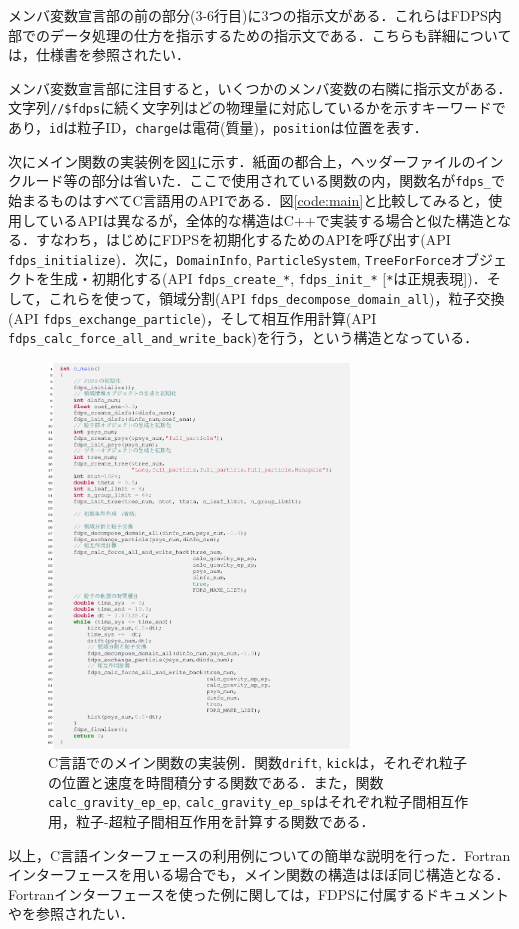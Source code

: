 メンバ変数宣言部の前の部分(3-6行目)に3つの指示文がある．これらはFDPS内部でのデータ処理の仕方を指示するための指示文である．こちらも詳細については，仕様書を参照されたい．

メンバ変数宣言部に注目すると，いくつかのメンバ変数の右隣に指示文がある．文字列\texttt{//\$fdps}に続く文字列はどの物理量に対応しているかを示すキーワードであり，\texttt{id}は粒子ID，\texttt{charge}は電荷(質量)，\texttt{position}は位置を表す．

次にメイン関数の実装例を図\ref{fig:src_main_in_c}に示す．紙面の都合上，ヘッダーファイルのインクルード等の部分は省いた．ここで使用されている関数の内，関数名が\texttt{fdps\_}で始まるものはすべてC言語用のAPIである．図\ref{code:main}と比較してみると，使用しているAPIは異なるが，全体的な構造はC++で実装する場合と似た構造となる．すなわち，はじめにFDPSを初期化するためのAPIを呼び出す(API \texttt{fdps\_initialize})．次に，\texttt{DomainInfo}, \texttt{ParticleSystem}, \texttt{TreeForForce}オブジェクトを生成・初期化する(API \texttt{fdps\_create\_*}, \texttt{fdps\_init\_*} [\texttt{*}は正規表現])．そして，これらを使って，領域分割(API \texttt{fdps\_decompose\_domain\_all})，粒子交換(API \texttt{fdps\_exchange\_particle})，そして相互作用計算(API \texttt{fdps\_calc\_force\_all\_and\_write\_back})を行う，という構造となっている．


\begin{figure}
\centering
\includegraphics[width=8cm]{./fig/src_main_in_c.eps}
\caption{C言語でのメイン関数の実装例．関数\texttt{drift}, \texttt{kick}は，それぞれ粒子の位置と速度を時間積分する関数である．また，関数\texttt{calc\_gravity\_ep\_ep}, \texttt{calc\_gravity\_ep\_sp}はそれぞれ粒子間相互作用，粒子-超粒子間相互作用を計算する関数である．}
\label{fig:src_main_in_c}
\end{figure}


以上，C言語インターフェースの利用例についての簡単な説明を行った．Fortranインターフェースを用いる場合でも，メイン関数の構造はほぼ同じ構造となる．Fortranインターフェースを使った例に関しては，FDPSに付属するドキュメントや\cite{2018PASJ...70...70N}を参照されたい．
